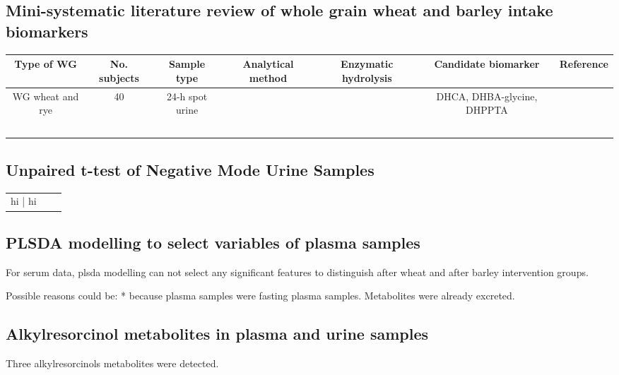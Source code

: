 \subsection{Mini-systematic literature review of whole grain wheat and barley intake biomarkers}

\begin{tabular}{|c|c|c|c|c|c|c|}
	\hline 
	Type of WG & No. subjects  & Sample type  & Analytical method & Enzymatic hydrolysis & Candidate biomarker & Reference \\ 
	\hline 
	WG wheat and rye & 40 & 24-h spot urine &  &  & DHCA, DHBA-glycine, DHPPTA & \\ 
	\hline 
	&  &  &  &  & & \\ 
	\hline 
	&  &  &  &  & & \\ 
	\hline 
	&  &  &  &  & & \\ 
	\hline 
	&  &  &  &  & & \\ 
	\hline 
	&  &  &  &  & & \\ 
	\hline 
\end{tabular} 


\subsection{Unpaired t-test of Negative Mode Urine Samples}
\begin{tabular}{c|c|c}
	hi | hi
\end{tabular}

\subsection{PLSDA modelling to select variables of plasma samples}
For serum data, plsda modelling can not select any significant features to distinguish after wheat and after barley intervention groups.

Possible reasons could be:
* because plasma samples were fasting plasma samples. Metabolites were already excreted.

\subsection{Alkylresorcinol metabolites in plasma and urine samples}
Three alkylresorcinols metabolites were detected. 